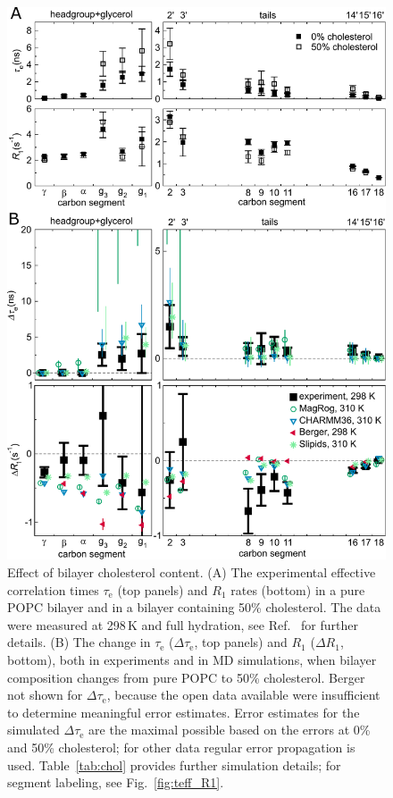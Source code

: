 \documentclass[journal=jcisd8,manuscript=article,layout=twocolumn]{achemso}
\begin{document}
\begin{figure}[h!]
	\centering
	\includegraphics[width=\columnwidth]{../Figs/cholesterol.pdf}  
	\caption{Effect of bilayer cholesterol content.
	(A) The experimental effective correlation times $\tau_\mathrm{e}$ (top panels) and $R_{1}$ rates (bottom) in a pure POPC bilayer and in a bilayer containing 50\% cholesterol. The data were measured at 298\,K and full hydration, see Ref.~ for further details.
	(B) The change in $\tau_\mathrm{e}$ ($\Delta\tau_\mathrm{e}$, top panels) and $R_{1}$ ($\Delta R_{1}$, bottom),
	both in experiments and in MD simulations, when bilayer composition changes from pure POPC to 50\% cholesterol.
	Berger not shown for $\Delta\tau_\mathrm{e}$, because the open data available were insufficient to determine meaningful error estimates.
	Error estimates for the simulated $\Delta\tau_\mathrm e$ are the maximal possible
	based on the errors at 0\% and 50\% cholesterol;
	for other data regular error propagation is used.
	Table~\ref{tab:chol} provides further simulation details;
	for segment labeling, see Fig.~\ref{fig:teff_R1}.
	}
	\label{fig:chol}
\end{figure}
\end{document}
